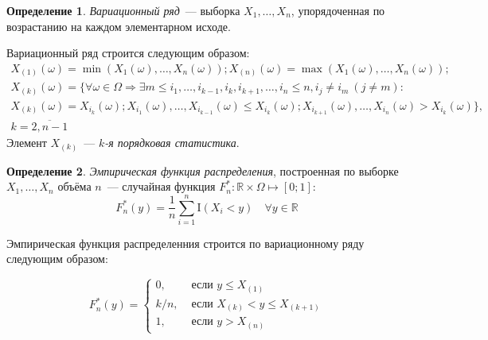 \documentclass[oneside,final,14pt]{extreport}
\theoremstyle{plain}
\theoremstyle{definition}
\newtheorem*{defn}{Определение}
\theoremstyle{named}
\begin{document}
\begin{defn}
{\it Вариационный ряд}~--- выборка $X_{1}, \ldots, X_{n}$, упорядоченная по возрастанию на каждом элементарном исходе.
\end{defn}
Вариационный ряд строится следующим образом:
\begin{multline*}
    X_{(1)}(\omega)=\min (X_{1}(\omega), \ldots, X_{n}(\omega)); X_{(n)}(\omega)=\max (X_{1}(\omega), \ldots, X_{n}(\omega)); \\
    X_{(k)}(\omega)=\{\forall \omega \in \Omega \Rightarrow \exists m \leqslant i_{1}, \ldots, i_{k-1}, i_{k}, i_{k+1}, \ldots, i_{n} \leqslant n, i_{j} \neq i_{m}~ (j \neq m): \\ 
    X_{(k)}(\omega)=X_{i_{k}}(\omega);
    X_{i_{1}}(\omega), \ldots, X_{i_{k-1}}(\omega) \leqslant X_{i_{k}}(\omega); X_{i_{k+1}}(\omega), \ldots, X_{i_{n}}(\omega)>X_{i_{k}}(\omega)\}, \\
    k = \overline{2, n-1}
\end{multline*}
Элемент $X_{(k)}$~--- {\it $k$-я порядковая статистика}.

\begin{defn}
{\it Эмпирическая функция распределения}, построенная по выборке $X_{1}, \ldots, X_{n}$ объёма $n$~--- случайная функция $F_{n}^{*}: \mathbb{R} \times \Omega \mapsto [0;1]$:
\begin{equation*}
    F_{n}^{*}(y) =\frac{1}{n} \sum\limits_{i=1}^{n} \mathrm{I}\left(X_{i}<y\right) \quad \forall y \in \mathbb{R}
\end{equation*}
\end{defn}

Эмпирическая функция распределенния строится по вариационному ряду следующим образом:

\begin{equation*}
    F_{n}^{*}(y)=\left\{\begin{array}{ll}
    0, & \text { если } y \leqslant X_{(1)} \\
    k/n, & \text { если } X_{(k)}<y \leqslant X_{(k+1)} \\
    1, & \text { если } y>X_{(n)}
    \end{array}\right.
\end{equation*}
\end{document}
